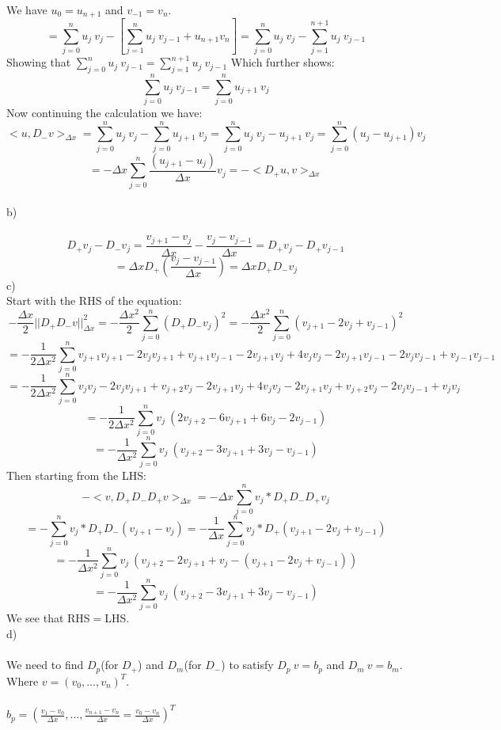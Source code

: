 \documentclass[12pt, letterpaper, twoside]{article}
\begin{document}
We have $u_0 = u_{n+1}$ and $v_{-1} = v_{n}$.
$$
=
\sum_{j=0}^n u_j\ v_j - [\sum_{j=1}^n u_j\ v_{j-1} + u_{n+1}v_{n}]
=
\sum_{j=0}^n u_j\ v_j - \sum_{j=1}^{n+1} u_j\ v_{j-1}
$$
Showing that $\sum_{j=0}^n u_j\ v_{j-1} = \sum_{j=1}^{n+1} u_j\ v_{j-1}$ Which further shows:
$$\sum_{j=0}^n u_j\ v_{j-1} = \sum_{j=0}^{n} u_{j+1}\ v_{j}$$
Now continuing the calculation we have:
$$
<u, D_-v>_{\Delta x}
=
\sum_{j=0}^n u_j\ v_j - \sum_{j=0}^{n} u_{j+1}\ v_{j}
=
\sum_{j=0}^n u_j\ v_j - u_{j+1}\ v_{j}
=
\sum_{j=0}^n (u_j - u_{j+1}) v_j
$$
$$
=
-\Delta x \sum_{j=0}^n \frac{(u_{j+1} - u_j)}{\Delta x} v_j
=
-<D_+u,v>_{\Delta x}
$$
\newpage
\ \\
b)\\
\ \\
$$
D_+ v_j - D_- v_j
=
\frac{v_{j+1} - v_j}{\Delta x} - \frac{v_j - v_{j-1}}{\Delta x}
=
D_+ v_j - D_+ v_{j-1}
$$
$$
=
\Delta x D_+ (\frac{v_j - v_{j-1}}{\Delta x})
=
\Delta x D_+ D_- v_j
$$
c)\\
Start with the RHS of the equation:
$$
-\frac{\Delta x}{2} ||D_+ D_- v||_{\Delta x}^2
=
-\frac{\Delta x^2}{2} \sum_{j=0}^n (D_+ D_- v_j)^2
=
-\frac{\Delta x^2}{2} \sum_{j=0}^n (v_{j+1} -2v_j + v_{j-1})^2
$$
$$
=
-\frac{1}{2\Delta x^2} \sum_{j=0}^n v_{j+1}v_{j+1} - 2v_{j}v_{j+1} + v_{j+1}v_{j-1} - 2v_{j+1}v_{j} +4v_{j}v_{j} - 2v_{j+1}v_{j-1} - 2v_{j}v_{j-1} + v_{j-1}v_{j-1}
$$
$$
=
-\frac{1}{2\Delta x^2} \sum_{j=0}^n v_{j}v_{j} -2v_{j}v_{j+1} + v_{j+2}v_{j} -2v_{j+1}v_{j} +4v_{j}v_{j} -2v_{j+1}v_{j} + v_{j+2}v_{j} - 2v_{j}v_{j-1} + v_{j}v_{j} 
$$
$$
=
-\frac{1}{2\Delta x^2} \sum_{j=0}^n v_j\ (2v_{j+2} - 6v_{j+1} + 6v_{j} - 2v_{j-1})
$$
$$
=
-\frac{1}{\Delta x^2} \sum_{j=0}^n v_j\ (v_{j+2} - 3v_{j+1} + 3v_{j} - v_{j-1})
$$
Then starting from the LHS:
$$
-<v,D_+D_-D_+v>_{\Delta x}
=
-\Delta x \sum_{j=0}^n v_j * D_+D_-D_+v_j
$$
$$
=
-\sum_{j=0}^n v_j * D_+D_-(v_{j+1} - v_j)
=
-\frac{1}{\Delta x} \sum_{j=0}^n v_j * D_+(v_{j+1} - 2v_j + v_{j-1})
$$
$$
=
-\frac{1}{\Delta x^2} \sum_{j=0}^n v_j\ (v_{j+2} - 2v_{j+1} + v_{j} - (v_{j+1} - 2v_j + v_{j-1}))
$$
$$
=
-\frac{1}{\Delta x^2} \sum_{j=0}^n v_j\ (v_{j+2} -3v_{j+1} + 3v_{j} - v_{j-1})
$$
We see that RHS$=$LHS.
\newpage
\ \\
d)\\
\ \\
We need to find $D_p$(for $D_+$) and $D_m$(for $D_-$) to satisfy $D_p\ v = b_p$ and $D_m\ v = b_m$.\\
Where $v = (v_0, ..., v_n)^T$.\\
\ \\
$b_p = (\frac{v_1 - v_0}{\Delta x}, ..., \frac{v_{n+1} - v_n}{\Delta x} = \frac{v_0 - v_n}{\Delta x})^T$\\
\end{document}
